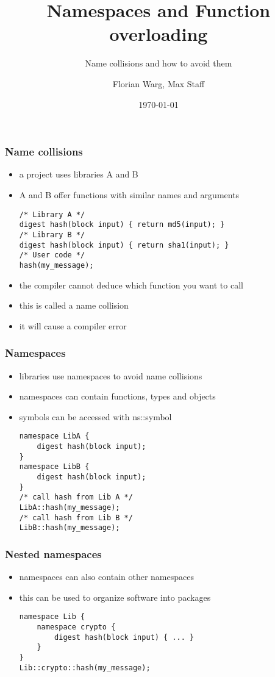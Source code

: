 



\title{Namespaces and Function overloading}
\subtitle{Name collisions and how to avoid them}
\date{\today}
\author{Florian Warg, Max Staff}

\maketitle

\begin{frame}[fragile]
    \frametitle{Name collisions}
    \begin{itemize}
        \item a project uses libraries A and B
        \item A and B offer functions with similar names and arguments
        \begin{lstlisting}[numbers=none]
/* Library A */
digest hash(block input) { return md5(input); }
/* Library B */
digest hash(block input) { return sha1(input); }
/* User code */
hash(my_message);
        \end{lstlisting}
        \item the compiler cannot deduce which function you want to call
        \item this is called a name collision
        \item it will cause a compiler error
    \end{itemize}
\end{frame}

\begin{frame}[fragile]
    \frametitle{Namespaces}
    \begin{itemize}
        \item libraries use namespaces to avoid name collisions 
        \item namespaces can contain functions, types and objects
        \item symbols can be accessed with ns::symbol
        \begin{lstlisting}[numbers=none]
namespace LibA {
    digest hash(block input);
}
namespace LibB {
    digest hash(block input);
}
/* call hash from Lib A */
LibA::hash(my_message);
/* call hash from Lib B */
LibB::hash(my_message);
        \end{lstlisting}
    \end{itemize}
\end{frame}

\begin{frame}[fragile]
    \frametitle{Nested namespaces}
    \begin{itemize}
        \item namespaces can also contain other namespaces
        \item this can be used to organize software into packages
        \begin{lstlisting}[numbers=none]
namespace Lib {
    namespace crypto {
        digest hash(block input) { ... }
    }
}
Lib::crypto::hash(my_message);
        \end{lstlisting}
    \end{itemize}
\end{frame}

